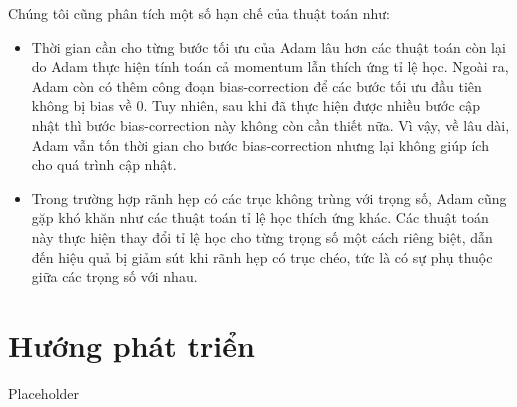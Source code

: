 Chúng tôi cũng phân tích một số hạn chế của thuật toán như:

\begin{itemize}
	\item Thời gian cần cho từng bước tối ưu của Adam lâu hơn các thuật toán còn lại do Adam thực hiện tính toán cả momentum lẫn thích ứng tỉ lệ học. Ngoài ra, Adam còn có thêm công đoạn bias-correction để các bước tối ưu đầu tiên không bị bias về 0. Tuy nhiên, sau khi đã thực hiện được nhiều bước cập nhật thì bước bias-correction này không còn cần thiết nữa. Vì vậy, về lâu dài, Adam vẫn tốn thời gian cho bước bias-correction nhưng lại không giúp ích cho quá trình cập nhật.
	\item Trong trường hợp rãnh hẹp có các trục không trùng với trọng số, Adam cũng gặp khó khăn như các thuật toán tỉ lệ học thích ứng khác. Các thuật toán này thực hiện thay đổi tỉ lệ học cho từng trọng số một cách riêng biệt, dẫn đến hiệu quả bị giảm sút khi rãnh hẹp có trục chéo, tức là có sự phụ thuộc giữa các trọng số với nhau.
\end{itemize}

\section{Hướng phát triển}

Placeholder